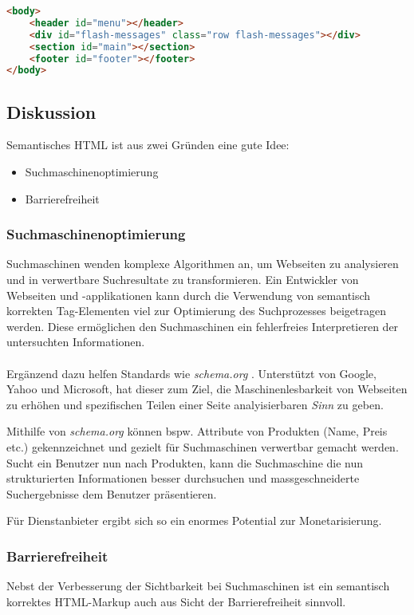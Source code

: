 \begin{lstlisting}[language=HTML, caption=Layout Definition \cite{roomiesHtmlSkeleton}, label=lst:layoutDefinition, firstnumber=27]
<body>
	<header id="menu"></header>
	<div id="flash-messages" class="row flash-messages"></div>
	<section id="main"></section>
	<footer id="footer"></footer>
</body>
\end{lstlisting}

\subsection*{Diskussion}
Semantisches HTML ist aus zwei Gründen eine gute Idee:
\begin{itemize}
	\item Suchmaschinenoptimierung
	\item Barrierefreiheit
\end{itemize}

\subsubsection*{Suchmaschinenoptimierung}
Suchmaschinen wenden komplexe Algorithmen an, um Webseiten zu analysieren und in verwertbare Suchresultate zu transformieren. Ein Entwickler von Webseiten und -applikationen kann durch die Verwendung von semantisch korrekten Tag-Elementen viel zur Optimierung des Suchprozesses beigetragen werden. Diese ermöglichen den Suchmaschinen ein fehlerfreies Interpretieren der untersuchten Informationen.
\\ \\
Ergänzend dazu helfen Standards wie \emph{schema.org} \cite{SchemaOrg}. Unterstützt von Google, Yahoo und Microsoft, hat dieser zum Ziel, die Maschinenlesbarkeit von Webseiten zu erhöhen und spezifischen Teilen einer Seite analyisierbaren \emph{Sinn} zu geben.

Mithilfe von \emph{schema.org} können bspw. Attribute von Produkten (Name, Preis etc.) gekennzeichnet und gezielt für Suchmaschinen verwertbar gemacht werden. Sucht ein Benutzer nun nach Produkten, kann die Suchmaschine die nun strukturierten Informationen besser durchsuchen und massgeschneiderte Suchergebnisse dem Benutzer präsentieren.

Für Dienstanbieter ergibt sich so ein enormes Potential zur Monetarisierung.

\subsubsection*{Barrierefreiheit}
Nebst der Verbesserung der Sichtbarkeit bei Suchmaschinen ist ein semantisch korrektes HTML-Markup auch aus Sicht der Barrierefreiheit sinnvoll.

